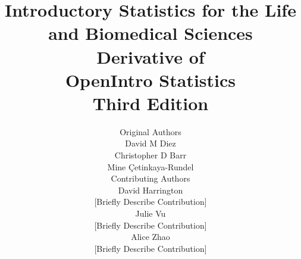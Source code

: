 

\title{\huge Introductory Statistics for the Life and Biomedical Sciences \\[2mm]
\large Derivative of \\
OpenIntro Statistics \\
Third Edition}
\author{\Large Original Authors \\[1.5mm]
\normalsize David M Diez \\
\normalsize Christopher D Barr \\
\normalsize Mine \c{C}etinkaya-Rundel \\[8mm]
\Large Contributing Authors \\[1.5mm]
\normalsize David Harrington \\
\small [Briefly Describe Contribution] \\[2mm]
\normalsize Julie Vu \\
\small [Briefly Describe Contribution] \\[2mm]
\normalsize Alice Zhao \\
\small [Briefly Describe Contribution] \\[2mm]
}

